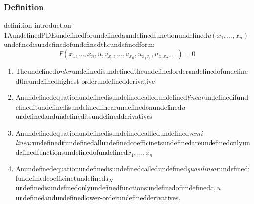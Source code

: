 \subsubsection{Definition}

\begin{mystthmdefinition}{}{definition-introduction-1}AundefinedPDEundefinedforundefinedaundefinedfunctionundefined$u(x_1,...,x_n)$undefinedisundefinedofundefinedtheundefinedform:
\begin{equation}
F(x_1,...,x_n, u,u_{x_1},...,u_{x_n},u_{x_1x_1},u_{x_1x_2},...)=0
\end{equation}

\begin{enumerate}
\item Theundefined\textit{order}undefinedisundefinedtheundefinedorderundefinedofundefinedtheundefinedhighest-orderundefinedderivative
\item Anundefinedequationundefinedisundefinedcalledundefined\textit{linear}undefinedifundefineditundefinedisundefinedlinearundefinedonundefined$u$undefinedandundefineditsundefinedderivatives
\item Anundefinedequationundefinedisundefinedcallledundefined\textit{semi-linear}undefinedifundefinedallundefinedcoefficinetsundefinedareundefinedonlyundefinedfunctionsundefinedofundefined$x_1,...,x_n$
\item Anundefinedequationundefinedisundefinedcalledundefined\textit{quasilinear}undefinedifundefinedcoefficinetundefined$a_N$undefinedisundefinedonlyundefinedfunctionsundefinedofundefined$x,u$undefinedandundefinedlower-orderundefinedderivatives.
\end{enumerate}

\end{mystthmdefinition}